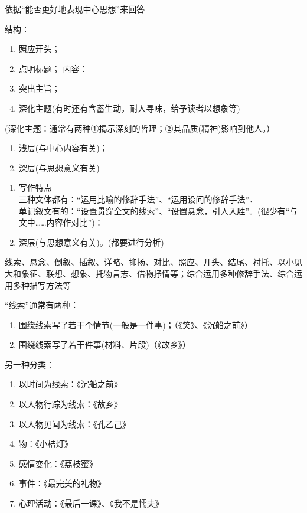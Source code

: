 依据``能否更好地表现中心思想''来回答

结构：\begin{enumerate}\item 照应开头；
        \item 点明标题；
内容：\item 突出主旨；
        \item 深化主题(有时还有含蓄生动，耐人寻味，给予读者以想象等)\end{enumerate}
        (深化主题：通常有两种①揭示深刻的哲理；②其品质(精神)影响到他人。）

\begin{enumerate}
\item 浅层(与中心内容有关)；
\item 深层(与思想意义有关)
\end{enumerate}

\begin{enumerate}
\item 写作特点\\
三种文体都有：``运用比喻的修辞手法''、``运用设问的修辞手法''．\\
单记叙文有的：``设置贯穿全文的线索''、``设置悬念，引人入胜''。(很少有``与文中\ldots{}\ldots{}内容作对比'')：\\
\item 深层(与思想意义有关)。(都要进行分析)
\end{enumerate}

线索、悬念、倒叙、插叙、详略、抑扬、对比、照应、开头、结尾、衬托、以小见大和象征、联想、想象、托物言志、借物抒情等；综合运用多种修辞手法、综合运用多种描写方法等

``线索''通常有两种：\begin{enumerate}\item 围绕线索写了若干个情节(一般是一件事)；（《笑》、《沉船之前》）
                      \item 围绕线索写了若干件事(材料、片段)（《故乡》）\end{enumerate}

另一种分类：\begin{enumerate}\item 以时间为线索：《沉船之前》
              \item 以人物行踪为线索：《故乡》
              \item 以人物见闻为线索：《孔乙己》
              \item 物：《小桔灯》
              \item 感情变化：《荔枝蜜》
              \item 事件：《最完美的礼物》
              \item 心理活动：《最后一课》、《我不是懦夫》\end{enumerate}

